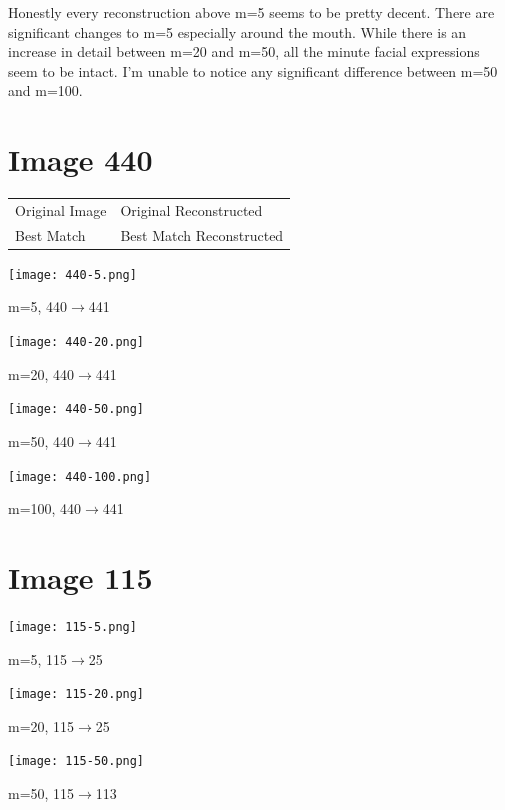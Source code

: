 \documentclass{article}
\begin{document}
Honestly every reconstruction above m=5 seems to be pretty decent. There are significant changes to m=5 especially around the mouth. While there is an increase in detail between m=20 and m=50, all the minute facial expressions seem to be intact. I'm unable to notice any significant difference between m=50 and m=100. 


\section{Image 440}

\begin{table}[htb]
\begin{tabular}{ll}
Original Image & Original Reconstructed   \\
Best Match     & Best Match Reconstructed
\end{tabular}
\end{table}

\begin{center}
    \texttt{[image: 440-5.png]}
    \caption{m=5, 440$\rightarrow$441}
\end{center}

\begin{center}
    \texttt{[image: 440-20.png]}
    \caption{m=20, 440$\rightarrow$441}
\end{center}

\begin{center}
    \texttt{[image: 440-50.png]}
    \caption{m=50, 440$\rightarrow$441}
\end{center}

\begin{center}
    \texttt{[image: 440-100.png]}
    \caption{m=100, 440$\rightarrow$441}
\end{center}

\section{Image 115}

\begin{center}
    \texttt{[image: 115-5.png]}
    \caption{m=5, 115$\rightarrow$25}
\end{center}

\begin{center}
    \texttt{[image: 115-20.png]}
    \caption{m=20, 115$\rightarrow$25}
\end{center}

\begin{center}
    \texttt{[image: 115-50.png]}
    \caption{m=50, 115$\rightarrow$113}
\end{center}
\end{document}

